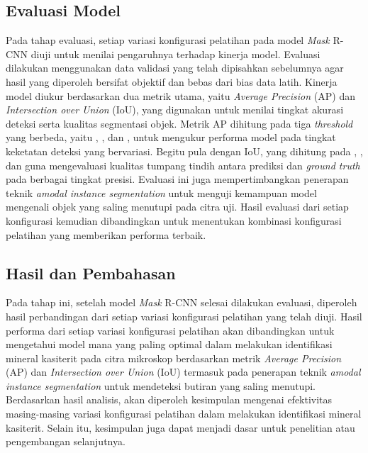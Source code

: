 \subsection{Evaluasi Model} \label{III.LangkahEvaluasiModel}
Pada tahap evaluasi, setiap variasi konfigurasi pelatihan pada model \textit{Mask} R-CNN diuji untuk menilai pengaruhnya terhadap kinerja model. Evaluasi dilakukan menggunakan data validasi yang telah dipisahkan sebelumnya agar hasil yang diperoleh bersifat objektif dan bebas dari bias data latih. Kinerja model diukur berdasarkan dua metrik utama, yaitu \textit{Average Precision} (AP) dan \textit{Intersection over Union} (IoU), yang digunakan untuk menilai tingkat akurasi deteksi serta kualitas segmentasi objek. Metrik AP dihitung pada tiga \textit{threshold} yang berbeda, yaitu \APfifty, \APseventyfive, dan \APrangefifty, untuk mengukur performa model pada tingkat keketatan deteksi yang bervariasi. Begitu pula dengan IoU, yang dihitung pada \IoUfifty, \IoUseventyfive, dan \IoUrangefifty guna mengevaluasi kualitas tumpang tindih antara prediksi dan \textit{ground truth} pada berbagai tingkat presisi. Evaluasi ini juga mempertimbangkan penerapan teknik \textit{amodal instance segmentation} untuk menguji kemampuan model mengenali objek yang saling menutupi pada citra uji. Hasil evaluasi dari setiap konfigurasi kemudian dibandingkan untuk menentukan kombinasi konfigurasi pelatihan yang memberikan performa terbaik. \par


\subsection{Hasil dan Pembahasan} \label{III.LangkahHasilDanPembahasan}
Pada tahap ini, setelah model \textit{Mask} R-CNN selesai dilakukan evaluasi, diperoleh hasil perbandingan dari setiap variasi konfigurasi pelatihan yang telah diuji. Hasil performa dari setiap variasi konfigurasi pelatihan akan dibandingkan untuk mengetahui model mana yang paling optimal dalam melakukan identifikasi mineral kasiterit pada citra mikroskop berdasarkan metrik \textit{Average Precision} (AP) dan \textit{Intersection over Union} (IoU) termasuk pada penerapan teknik \textit{amodal instance segmentation} untuk mendeteksi butiran yang saling menutupi. Berdasarkan hasil analisis, akan diperoleh kesimpulan mengenai efektivitas masing-masing variasi konfigurasi pelatihan dalam melakukan identifikasi mineral kasiterit. Selain itu, kesimpulan juga dapat menjadi dasar untuk penelitian atau pengembangan selanjutnya. \par

